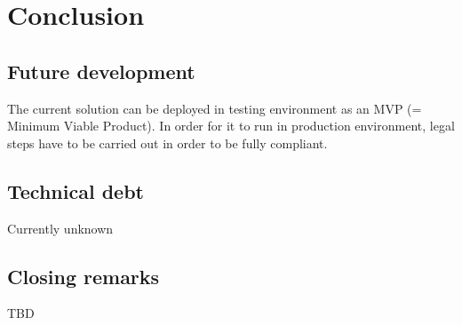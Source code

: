 \chapter{Conclusion}

\section{Future development}

The current solution can be deployed in testing environment as an MVP (= Minimum Viable Product). In order for it to run in production environment, legal steps have to be carried out in order to be fully compliant.

\section{Technical debt}
Currently unknown

\section{Closing remarks}
TBD